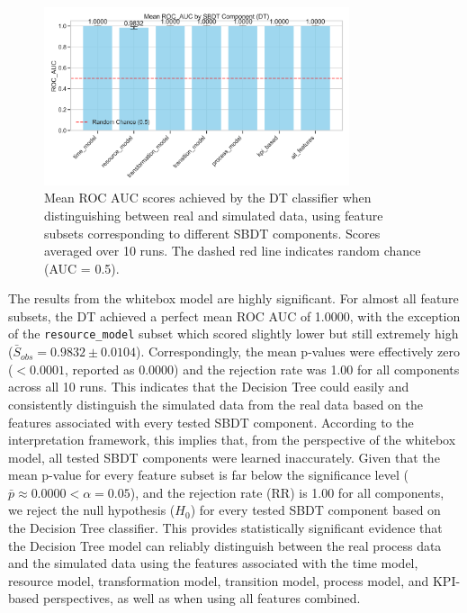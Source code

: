 \begin{figure}[htbp]
  \centering
  \includegraphics[width=0.8\textwidth]{figures/dt-roc-auc-by-component.png}
  \caption{Mean ROC AUC scores achieved by the DT classifier when distinguishing between real and simulated data, using feature subsets corresponding to different SBDT components. Scores averaged over 10 runs. The dashed red line indicates random chance (AUC = 0.5).}
  \label{fig:dt-roc-auc}
\end{figure}

The results from the whitebox model are highly significant. For almost all feature subsets, the DT achieved a perfect mean ROC AUC of 1.0000, with the exception of the \texttt{resource\_model} subset which scored slightly lower but still extremely high ($\bar{S}_{obs}=0.9832 \pm 0.0104$). Correspondingly, the mean p-values were effectively zero ($< 0.0001$, reported as 0.0000) and the rejection rate was 1.00 for all components across all 10 runs. This indicates that the Decision Tree could easily and consistently distinguish the simulated data from the real data based on the features associated with every tested SBDT component. According to the interpretation framework, this implies that, from the perspective of the whitebox model, all tested SBDT components were learned inaccurately.
Given that the mean p-value for every feature subset is far below the significance level ($\bar{p} \approx 0.0000 < \alpha = 0.05$), and the rejection rate (RR) is 1.00 for all components, we reject the null hypothesis ($H_0$) for every tested SBDT component based on the Decision Tree classifier. This provides statistically significant evidence that the Decision Tree model can reliably distinguish between the real process data and the simulated data using the features associated with the time model, resource model, transformation model, transition model, process model, and KPI-based perspectives, as well as when using all features combined.

